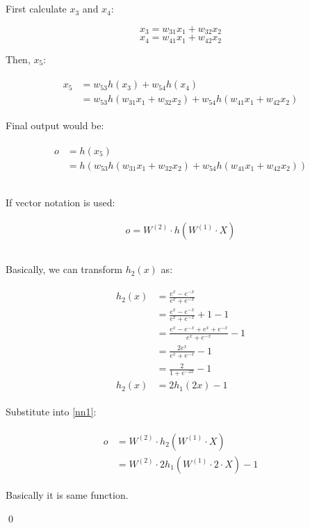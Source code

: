 \documentclass[preview]{standalone}
\begin{document}
\section{}

\subsection{}

First calculate $x_3$ and $x_4$:

\[x_3 = w_{31} x_1 + w_{32} x_2\]
\[x_4 = w_{41} x_1 + w_{42} x_2\]

Then, $x_5$:

\begin{align}
\begin{split}
x_5 &= w_{53} h(x_3) + w_{54} h(x_4)\\
    &= w_{53} h(w_{31} x_1 + w_{32} x_2) + w_{54} h(w_{41} x_1 + w_{42} x_2)
\end{split}
\end{align}

Final output would be:

\begin{align}
\begin{split}
o
&= h(x_5)\\
&= h(w_{53} h(w_{31} x_1 + w_{32} x_2) + w_{54} h(w_{41} x_1 + w_{42} x_2))
\end{split}
\end{align}

\subsection{}

If vector notation is used:

\begin{align}
    \label{nn1}
    o = W^{(2)} \cdot h(W^{(1)} \cdot X)
\end{align}

\subsection{}

Basically, we can transform $h_2(x)$ as:

\begin{align}
\begin{split}
    h_2(x) &= \frac{e^x-e^{-x}}{e^x+e^{-x}}\\
           &= \frac{e^x-e^{-x}}{e^x+e^{-x}} + 1 - 1\\
           &= \frac{e^x-e^{-x} + e^x + e^{-x}}{e^x+e^{-x}} - 1\\
           &= \frac{2e^x}{e^x+e^{-x}} - 1\\
           &= \frac{2}{1+e^{-2x}} - 1\\
    h_2(x) &= 2h_1(2x)-1
\end{split}
\end{align}

Substitute into \cref{nn1}:

\begin{align}
\begin{split}
o &= W^{(2)} \cdot h_2(W^{(1)} \cdot X) \\
  &= W^{(2)} \cdot2h_1(W^{(1)} \cdot 2 \cdot X) - 1
\end{split}
\end{align}

Basically it is same function.

\qed
\end{document}
